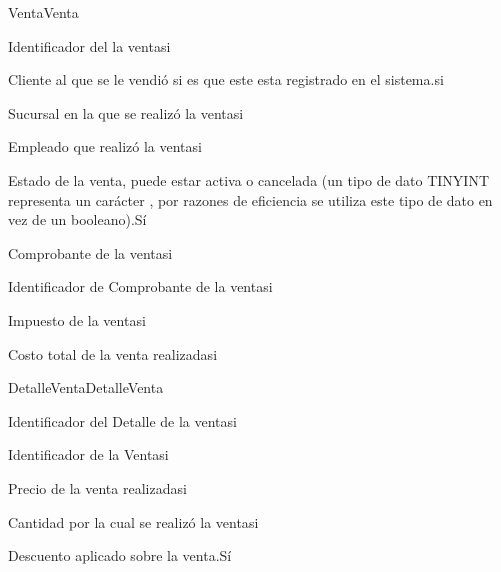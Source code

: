 \begin{cdtEntidad}{Venta}{Venta}

		{Identificador del la venta}{si}
		
		{Cliente al que se le vendió si es que este esta registrado en el sistema.}{si}
		
		{Sucursal en la que se realizó la venta}{si}
		
		{Empleado que realizó la venta}{si}
		
		{Estado de la venta, puede estar activa o cancelada (un tipo de dato TINYINT representa un carácter , por razones de eficiencia se utiliza este tipo de dato en vez de un booleano).}{Sí}	

		{Comprobante de la venta}{si}
		
		{Identificador de Comprobante de la venta}{si}
		
		{Impuesto de la venta}{si}
		
		{Costo total de la venta realizada}{si}
		
		\cdtEntityRelSection
		
	
\end{cdtEntidad}

\begin{cdtEntidad}{DetalleVenta}{DetalleVenta}

		{Identificador del Detalle de la venta}{si}
		
		{Identificador de la Venta}{si}
		
		{Precio de la venta realizada}{si}
		
		{Cantidad por la cual se realizó la venta}{si}
		
		{Descuento aplicado sobre la venta.}{Sí}	
	
\end{cdtEntidad}

